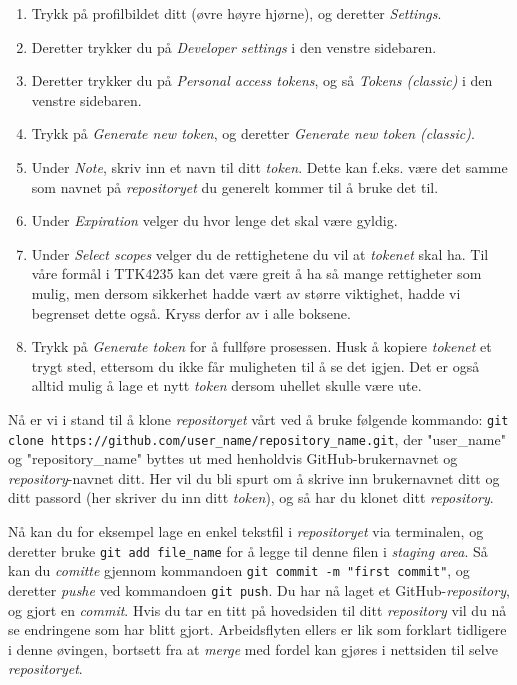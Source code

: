 \begin{enumerate}
    \item Trykk på profilbildet ditt (øvre høyre hjørne), og deretter \textit{Settings}.
    \item Deretter trykker du på \textit{Developer settings} i den venstre sidebaren.
    \item Deretter trykker du på \textit{Personal access tokens}, og så \textit{Tokens (classic)} i den venstre sidebaren.
    \item Trykk på \textit{Generate new token}, og deretter \textit{Generate new token (classic)}.
    \item Under \textit{Note}, skriv inn et navn til ditt \textit{token}. Dette kan f.eks. være det samme som navnet på \textit{repositoryet} du generelt kommer til å bruke det til.
    \item Under \textit{Expiration} velger du hvor lenge det skal være gyldig.
    \item Under \textit{Select scopes} velger du de rettighetene du vil at \textit{tokenet} skal ha. Til våre formål i TTK4235 kan det være greit å ha så mange rettigheter som mulig, men dersom sikkerhet hadde vært av større viktighet, hadde vi begrenset dette også. Kryss derfor av i alle boksene.
    \item Trykk på \textit{Generate token} for å fullføre prosessen. Husk å kopiere \textit{tokenet} et trygt sted, ettersom du ikke får muligheten til å se det igjen. Det er også alltid mulig å lage et nytt \textit{token} dersom uhellet skulle være ute.
\end{enumerate}

Nå er vi i stand til å klone \textit{repositoryet} vårt ved å bruke følgende kommando: \verb|git clone https://github.com/user_name/repository_name.git|, der "user\_name" og "repository\_name" byttes ut med henholdvis GitHub-brukernavnet og \textit{repository}-navnet ditt. Her vil du bli spurt om å skrive inn brukernavnet ditt og ditt passord (her skriver du inn ditt \textit{token}), og så har du klonet ditt \textit{repository}. 

Nå kan du for eksempel lage en enkel tekstfil i \textit{repositoryet} via terminalen, og deretter bruke \verb|git add file_name| for å legge til denne filen i \textit{staging area}. Så kan du \textit{comitte} gjennom kommandoen \verb|git commit -m "first commit"|, og deretter \textit{pushe} ved kommandoen \verb|git push|. Du har nå laget et GitHub-\textit{repository}, og gjort en \textit{commit}. Hvis du tar en titt på hovedsiden til ditt \textit{repository} vil du nå se endringene som har blitt gjort. Arbeidsflyten ellers er lik som forklart tidligere i denne øvingen, bortsett fra at \textit{merge} med fordel kan gjøres i nettsiden til selve \textit{repositoryet}.


